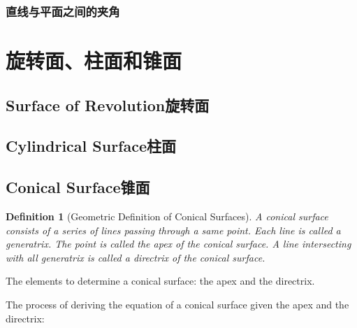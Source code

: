\documentclass[onecolumn]{ctexart}
\newtheorem{definition}{Definition}
\begin{document}
\subsubsection{直线与平面之间的夹角}

\section{旋转面、柱面和锥面}

\subsection{Surface of Revolution旋转面}

\subsection{Cylindrical Surface柱面}

\subsection{Conical Surface锥面}

\begin{definition}[Geometric Definition of Conical Surfaces]
  A conical surface consists of a series of lines passing through a same point. 
  Each line is called a generatrix. The point is called the apex of the conical 
  surface. A line intersecting with all generatrix is called a directrix of the 
  conical surface.
\end{definition}

The elements to determine a conical surface: the apex and the directrix.

The process of deriving the equation of a conical surface given the apex and the 
directrix:
\end{document}
